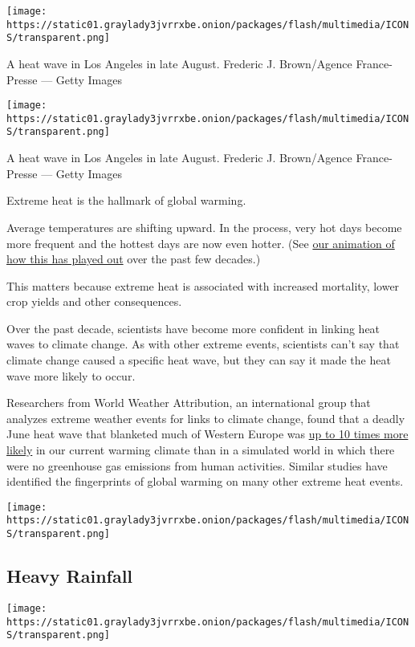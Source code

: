 \texttt{[image: https://static01.graylady3jvrrxbe.onion/packages/flash/multimedia/ICONS/transparent.png]}

A heat wave in Los Angeles in late August. Frederic J. Brown/Agence
France-Presse --- Getty Images

\texttt{[image: https://static01.graylady3jvrrxbe.onion/packages/flash/multimedia/ICONS/transparent.png]}

A heat wave in Los Angeles in late August. Frederic J. Brown/Agence
France-Presse --- Getty Images

Extreme heat is the hallmark of global warming.

Average temperatures are shifting upward. In the process, very hot days
become more frequent and the hottest days are now even hotter. (See
\href{https://www.nytimes3xbfgragh.onion/interactive/2017/07/28/climate/more-frequent-extreme-summer-heat.html}{our
animation of how this has played out} over the past few decades.)

This matters because extreme heat is associated with increased
mortality, lower crop yields and other consequences.

Over the past decade, scientists have become more confident in linking
heat waves to climate change. As with other extreme events, scientists
can't say that climate change caused a specific heat wave, but they can
say it made the heat wave more likely to occur.

Researchers from World Weather Attribution, an international group that
analyzes extreme weather events for links to climate change, found that
a deadly June heat wave that blanketed much of Western Europe was
\href{https://wwa.climatecentral.org/analyses/europe-heat-june-2017/}{up
to 10 times more likely} in our current warming climate than in a
simulated world in which there were no greenhouse gas emissions from
human activities. Similar studies have identified the fingerprints of
global warming on many other extreme heat events.

\texttt{[image: https://static01.graylady3jvrrxbe.onion/packages/flash/multimedia/ICONS/transparent.png]}

\hypertarget{heavy-rainfall}{%
\subsection{Heavy Rainfall}\label{heavy-rainfall}}

\texttt{[image: https://static01.graylady3jvrrxbe.onion/packages/flash/multimedia/ICONS/transparent.png]}

